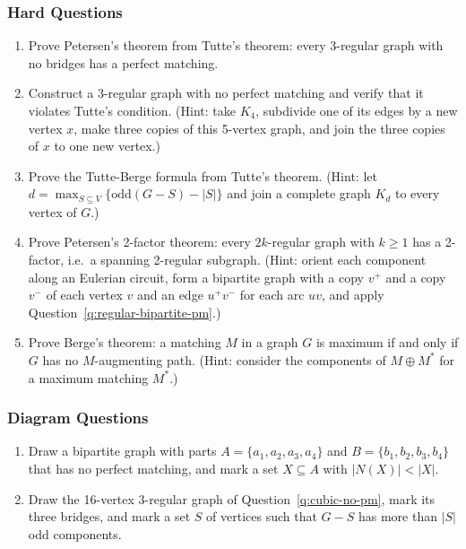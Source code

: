\documentclass{article}
\theoremstyle{definition}
\begin{document}
\subsubsection{Hard Questions}
\begin{enumerate}[start=14]
\item Prove Petersen's theorem from Tutte's theorem: every 3-regular graph with no bridges has a perfect matching.

\item\label{q:cubic-no-pm} Construct a 3-regular graph with no perfect matching and verify that it violates Tutte's condition. (Hint: take $K_4$, subdivide one of its edges by a new vertex $x$, make three copies of this 5-vertex graph, and join the three copies of $x$ to one new vertex.)

\item Prove the Tutte-Berge formula from Tutte's theorem. (Hint: let $d = \max_{S \subseteq V}\{\text{odd}(G-S) - |S|\}$ and join a complete graph $K_d$ to every vertex of $G$.)

\item Prove Petersen's 2-factor theorem: every $2k$-regular graph with $k \geq 1$ has a 2-factor, i.e.\ a spanning 2-regular subgraph. (Hint: orient each component along an Eulerian circuit, form a bipartite graph with a copy $v^+$ and a copy $v^-$ of each vertex $v$ and an edge $u^+v^-$ for each arc $uv$, and apply Question~\ref{q:regular-bipartite-pm}.)

\item Prove Berge's theorem: a matching $M$ in a graph $G$ is maximum if and only if $G$ has no $M$-augmenting path. (Hint: consider the components of $M \oplus M^*$ for a maximum matching $M^*$.)
\end{enumerate}

\subsubsection{Diagram Questions}
\begin{enumerate}[start=19]
\item Draw a bipartite graph with parts $A = \{a_1, a_2, a_3, a_4\}$ and $B = \{b_1, b_2, b_3, b_4\}$ that has no perfect matching, and mark a set $X \subseteq A$ with $|N(X)| < |X|$.

\item Draw the 16-vertex 3-regular graph of Question~\ref{q:cubic-no-pm}, mark its three bridges, and mark a set $S$ of vertices such that $G - S$ has more than $|S|$ odd components.
\end{enumerate}
\end{document}
